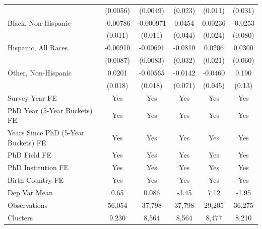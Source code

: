 \begin{table}[htbp]
\begin{tabular}{l*{5}{c}}
  &    (0.0056)         &    (0.0049)         &     (0.023)         &     (0.011)         &     (0.031)         \\
[1em]
Black, Non-Hispanic&    -0.00786         &   -0.000971         &      0.0454         &     0.00236         &     -0.0253         \\
  &     (0.011)         &     (0.011)         &     (0.044)         &     (0.024)         &     (0.080)         \\
[1em]
Hispanic, All Races&    -0.00910         &    -0.00691         &     -0.0810\sym{**} &      0.0206         &      0.0300         \\
  &    (0.0087)         &    (0.0083)         &     (0.032)         &     (0.021)         &     (0.060)         \\
[1em]
Other, Non-Hispanic&      0.0201         &    -0.00565         &     -0.0142         &     -0.0460         &       0.190         \\
  &     (0.018)         &     (0.018)         &     (0.071)         &     (0.045)         &      (0.13)         \\
[1em]
Survey Year FE&         Yes         &         Yes         &         Yes         &         Yes         &         Yes         \\
[1em]
PhD Year (5-Year Buckets) FE&         Yes         &         Yes         &         Yes         &         Yes         &         Yes         \\
[1em]
Years Since PhD (5-Year Buckets) FE&         Yes         &         Yes         &         Yes         &         Yes         &         Yes         \\
[1em]
PhD Field FE&         Yes         &         Yes         &         Yes         &         Yes         &         Yes         \\
[1em]
PhD Institution FE&         Yes         &         Yes         &         Yes         &         Yes         &         Yes         \\
[1em]
Birth Country FE&         Yes         &         Yes         &         Yes         &         Yes         &         Yes         \\
\hline
Dep Var Mean&        0.65         &       0.086         &       -3.45         &        7.12         &       -1.95         \\
Observations&      56,054         &      37,798         &      37,798         &      29,205         &      36,275         \\
Clusters&       9,230         &       8,564         &       8,564         &       8,477         &       8,210         \\

\end{tabular}
\end{table}
